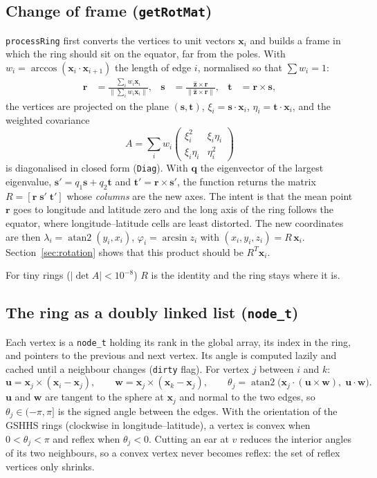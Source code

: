 \documentclass[11pt,a4paper]{article}
\newcommand{\code}[1]{\texttt{#1}}
\newcommand{\vx}{\mathbf{x}}
\begin{document}
\subsection{Change of frame (\code{getRotMat})}

\code{processRing} first converts the vertices to unit vectors $\vx_i$ and builds a frame in which
the ring should sit on the equator, far from the poles. With $w_i = \arccos(\vx_i\cdot\vx_{i+1})$
the length of edge $i$, normalised so that $\sum w_i = 1$:
\begin{align*}
\mathbf{r} &= \frac{\sum_i w_i \vx_i}{\|\sum_i w_i \vx_i\|}, &
\mathbf{s} &= \frac{\hat{\mathbf z}\times\mathbf r}{\|\hat{\mathbf z}\times\mathbf r\|}, &
\mathbf{t} &= \mathbf r\times\mathbf s,
\end{align*}
the vertices are projected on the plane $(\mathbf s,\mathbf t)$, $\xi_i=\mathbf s\cdot\vx_i$,
$\eta_i=\mathbf t\cdot\vx_i$, and the weighted covariance
\[
A = \sum_i w_i \begin{pmatrix}\xi_i^2 & \xi_i\eta_i\\ \xi_i\eta_i & \eta_i^2\end{pmatrix}
\]
is diagonalised in closed form (\code{Diag}). With $\mathbf q$ the eigenvector of the largest
eigenvalue, $\mathbf s' = q_1\mathbf s + q_2\mathbf t$ and $\mathbf t' = \mathbf r\times\mathbf s'$,
the function returns the matrix $R = [\mathbf r\;\mathbf s'\;\mathbf t']$ whose \emph{columns} are
the new axes. The intent is that the mean point $\mathbf r$ goes to longitude and latitude zero and
the long axis of the ring follows the equator, where longitude--latitude cells are least distorted.
The new coordinates are then $\lambda_i = \operatorname{atan2}(y_i, x_i)$,
$\varphi_i = \arcsin z_i$ with $(x_i,y_i,z_i) = R\,\vx_i$. Section~\ref{sec:rotation} shows that
this product should be $R^T\vx_i$.

For tiny rings ($|\det A| < 10^{-8}$) $R$ is the identity and the ring stays where it is.

\subsection{The ring as a doubly linked list (\code{node\_t})}

Each vertex is a \code{node\_t} holding its rank in the global array, its index in the ring, and
pointers to the previous and next vertex. Its angle is computed lazily and cached until a
neighbour changes (\code{dirty} flag). For vertex $j$ between $i$ and $k$:
\[
\mathbf u = \vx_j\times(\vx_i-\vx_j),\qquad
\mathbf w = \vx_j\times(\vx_k-\vx_j),\qquad
\theta_j = \operatorname{atan2}\bigl(\vx_j\cdot(\mathbf u\times\mathbf w),\;\mathbf u\cdot\mathbf w\bigr).
\]
$\mathbf u$ and $\mathbf w$ are tangent to the sphere at $\vx_j$ and normal to the two edges, so
$\theta_j\in(-\pi,\pi]$ is the signed angle between the edges. With the orientation of the GSHHS
rings (clockwise in longitude--latitude), a vertex is convex when $0<\theta_j<\pi$ and reflex when
$\theta_j<0$. Cutting an ear at $v$ reduces the interior angles of its two neighbours, so a convex
vertex never becomes reflex: the set of reflex vertices only shrinks.
\end{document}
